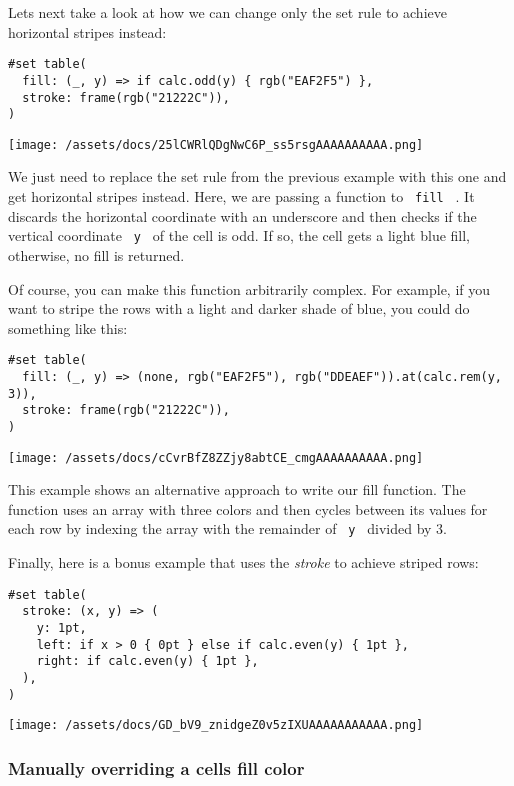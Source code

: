 Let\textquotesingle s next take a look at how we can change only the set
rule to achieve horizontal stripes instead:

\begin{verbatim}
#set table(
  fill: (_, y) => if calc.odd(y) { rgb("EAF2F5") },
  stroke: frame(rgb("21222C")),
)
\end{verbatim}

\texttt{[image: /assets/docs/25lCWRlQDgNwC6P\_ss5rsgAAAAAAAAAA.png]}

We just need to replace the set rule from the previous example with this
one and get horizontal stripes instead. Here, we are passing a function
to \texttt{\ fill\ } . It discards the horizontal coordinate with an
underscore and then checks if the vertical coordinate \texttt{\ y\ } of
the cell is odd. If so, the cell gets a light blue fill, otherwise, no
fill is returned.

Of course, you can make this function arbitrarily complex. For example,
if you want to stripe the rows with a light and darker shade of blue,
you could do something like this:

\begin{verbatim}
#set table(
  fill: (_, y) => (none, rgb("EAF2F5"), rgb("DDEAEF")).at(calc.rem(y, 3)),
  stroke: frame(rgb("21222C")),
)
\end{verbatim}

\texttt{[image: /assets/docs/cCvrBfZ8ZZjy8abtCE\_cmgAAAAAAAAAA.png]}

This example shows an alternative approach to write our fill function.
The function uses an array with three colors and then cycles between its
values for each row by indexing the array with the remainder of
\texttt{\ y\ } divided by 3.

Finally, here is a bonus example that uses the \emph{stroke} to achieve
striped rows:

\begin{verbatim}
#set table(
  stroke: (x, y) => (
    y: 1pt,
    left: if x > 0 { 0pt } else if calc.even(y) { 1pt },
    right: if calc.even(y) { 1pt },
  ),
)
\end{verbatim}

\texttt{[image: /assets/docs/GD\_bV9\_znidgeZ0v5zIXUAAAAAAAAAAA.png]}

\subsubsection{Manually overriding a cell\textquotesingle s fill
color}\label{fill-override}

